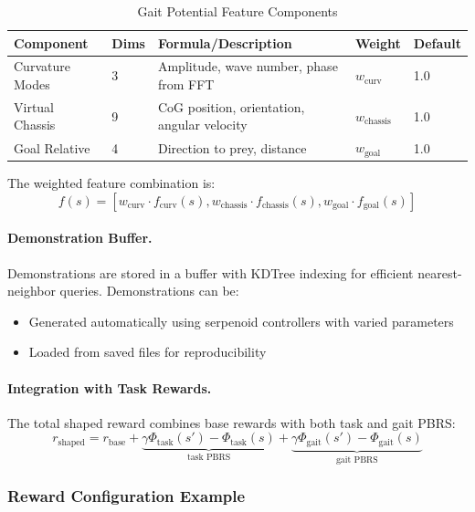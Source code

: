 \documentclass[11pt]{article}
\begin{document}
\begin{table}[H]
\centering
\caption{Gait Potential Feature Components}
\begin{tabular}{@{}lllll@{}}
\toprule
\textbf{Component} & \textbf{Dims} & \textbf{Formula/Description} & \textbf{Weight} & \textbf{Default} \\
\midrule
Curvature Modes & 3 & Amplitude, wave number, phase from FFT & $w_{\text{curv}}$ & 1.0 \\
Virtual Chassis & 9 & CoG position, orientation, angular velocity & $w_{\text{chassis}}$ & 1.0 \\
Goal Relative & 4 & Direction to prey, distance & $w_{\text{goal}}$ & 1.0 \\
\bottomrule
\end{tabular}
\end{table}

The weighted feature combination is:
\begin{equation}
    f(s) = [w_{\text{curv}} \cdot f_{\text{curv}}(s), w_{\text{chassis}} \cdot f_{\text{chassis}}(s), w_{\text{goal}} \cdot f_{\text{goal}}(s)]
\end{equation}

\paragraph{Demonstration Buffer.}
Demonstrations are stored in a buffer with KDTree indexing for efficient nearest-neighbor queries. Demonstrations can be:
\begin{itemize}
    \item Generated automatically using serpenoid controllers with varied parameters
    \item Loaded from saved files for reproducibility
\end{itemize}

\paragraph{Integration with Task Rewards.}
The total shaped reward combines base rewards with both task and gait PBRS:
\begin{equation}
    r_{\text{shaped}} = r_{\text{base}} + \underbrace{\gamma \Phi_{\text{task}}(s') - \Phi_{\text{task}}(s)}_{\text{task PBRS}} + \underbrace{\gamma \Phi_{\text{gait}}(s') - \Phi_{\text{gait}}(s)}_{\text{gait PBRS}}
\end{equation}

\subsubsection{Reward Configuration Example}
\end{document}
